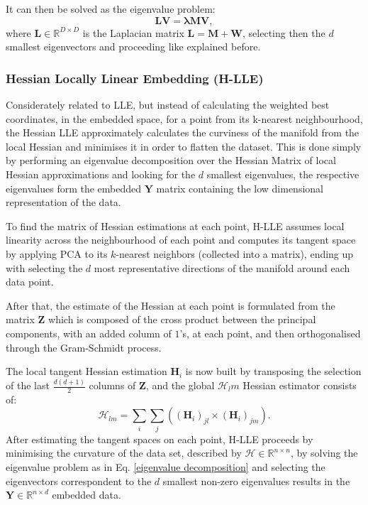         It can then be solved as the eigenvalue problem:
        \begin{equation}
            \bm{LV} = \bm{\lambda MV},
        \end{equation}
        where $\bm{L}\in\mathbb{R}^{D\times D}$ is the Laplacian matrix $\bm{L} = \bm{M}+\bm{W}$, selecting then the $d$ smallest eigenvectors and proceeding like explained before.

    \subsubsection{Hessian Locally Linear Embedding (H-LLE)}
        Considerately related to LLE, but instead of calculating the weighted best coordinates, in the embedded space, for a point from its k-nearest neighbourhood, the Hessian LLE \cite{h-lle} approximately calculates the curviness of the manifold from the local Hessian and minimises it in order to flatten the dataset.
        This is done simply by performing an eigenvalue decomposition over the Hessian Matrix of local Hessian approximations and looking for the $d$ smallest eigenvalues, the respective eigenvalues form the embedded $\bm{Y}$ matrix containing the low dimensional representation of the data.

        To find the matrix of Hessian estimations at each point, H-LLE assumes local linearity across the neighbourhood of each point and computes its tangent space by applying PCA to its $k$-nearest neighbors (collected into a matrix), ending up with selecting the $d$ most representative directions of the manifold around each data point.
        
        After that, the estimate of the Hessian at each point is formulated from the matrix $\bm{Z}$ which is composed of the cross product between the principal components, with an added column of $1$'s, at each point, and then orthogonalised through the Gram-Schmidt process.

        The local tangent Hessian estimation $\bm{H}_i$ is now built by transposing the selection of the last $\frac{d(d+1)}{2}$ columns of $\bm{Z}$, and the global $\bm{\mathcal{H}}_lm$ Hessian estimator consists of:
        \begin{equation}
            \bm{\mathcal{H}}_{lm} = \sum_{i} \sum_{j} \left((\bm{H}_i)_{jl} \times (\bm{H}_i)_{jm}\right).
        \end{equation}
        After estimating the tangent spaces on each point, H-LLE proceeds by minimising the curvature of the data set, described by $\bm{\mathcal{H}} \in \mathbb{R}^{n\times n}$, by solving the eigenvalue problem as in Eq. \ref{eigenvalue decomposition} and selecting the eigenvectors correspondent to the $d$ smallest non-zero eigenvalues results in the $\bm{Y} \in\mathbb{R}^{n\times d}$ embedded data.

